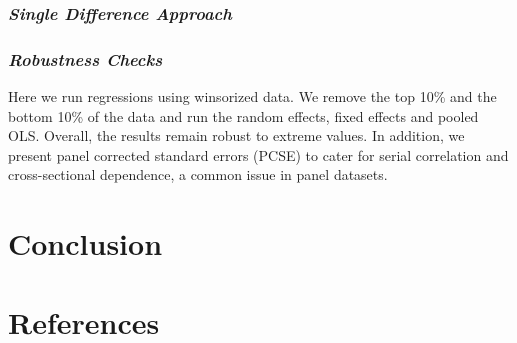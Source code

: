 \documentclass[
]{article}
\begin{document}
\hypertarget{single-difference-approach}{%
\subsubsection{\texorpdfstring{\textbf{\emph{Single Difference
Approach}}}{Single Difference Approach}}\label{single-difference-approach}}

\hypertarget{robustness-checks}{%
\subsubsection{\texorpdfstring{\textbf{\emph{Robustness
Checks}}}{Robustness Checks}}\label{robustness-checks}}

Here we run regressions using winsorized data. We remove the top 10\%
and the bottom 10\% of the data and run the random effects, fixed
effects and pooled OLS. Overall, the results remain robust to extreme
values. In addition, we present panel corrected standard errors (PCSE)
to cater for serial correlation and cross-sectional dependence, a common
issue in panel datasets.

\hypertarget{conclusion}{%
\section{\texorpdfstring{\textbf{Conclusion}}{Conclusion}}\label{conclusion}}

\hypertarget{references}{%
\section{\texorpdfstring{\textbf{References}}{References}}\label{references}}
\end{document}
